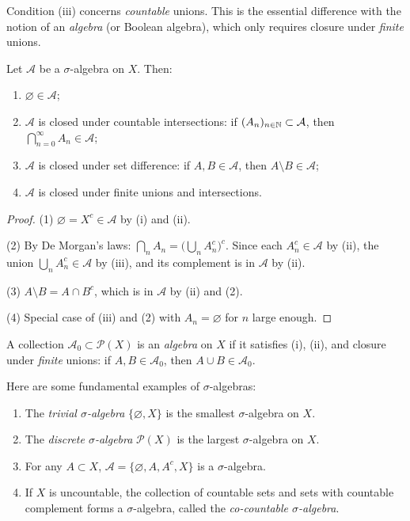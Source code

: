 \begin{remark}
Condition (iii) concerns \emph{countable} unions. This is the essential difference
with the notion of an \emph{algebra} (or Boolean algebra), which only requires
closure under \emph{finite} unions.
\end{remark}

\begin{proposition}
\label{prop:sigma_props}
Let $\mathcal{A}$ be a $\sigma$-algebra on $X$. Then:
\begin{enumerate}
    \item $\varnothing \in \mathcal{A}$;
    \item $\mathcal{A}$ is closed under countable intersections: if
    $(A_n)_{n \in \mathbb{N}} \subset \mathcal{A}$, then
    $\bigcap_{n=0}^{\infty} A_n \in \mathcal{A}$;
    \item $\mathcal{A}$ is closed under set difference: if $A, B \in \mathcal{A}$,
    then $A \setminus B \in \mathcal{A}$;
    \item $\mathcal{A}$ is closed under finite unions and intersections.
\end{enumerate}
\end{proposition}

\begin{proof}
(1) $\varnothing = X^c \in \mathcal{A}$ by (i) and (ii).

(2) By De Morgan's laws:
$\bigcap_n A_n = \bigl(\bigcup_n A_n^c\bigr)^c$. Since each
$A_n^c \in \mathcal{A}$ by (ii), the union $\bigcup_n A_n^c \in \mathcal{A}$
by (iii), and its complement is in $\mathcal{A}$ by (ii).

(3) $A \setminus B = A \cap B^c$, which is in $\mathcal{A}$ by (ii) and (2).

(4) Special case of (iii) and (2) with $A_n = \varnothing$ for $n$ large enough.
\end{proof}

\begin{definition}[Algebra]
A collection $\mathcal{A}_0 \subset \mathcal{P}(X)$ is an \emph{algebra} on $X$
if it satisfies (i), (ii), and closure under \emph{finite} unions:
if $A, B \in \mathcal{A}_0$, then $A \cup B \in \mathcal{A}_0$.
\end{definition}

\begin{example}
Here are some fundamental examples of $\sigma$-algebras:
\begin{enumerate}
    \item The \emph{trivial $\sigma$-algebra} $\{\varnothing, X\}$ is the smallest
    $\sigma$-algebra on $X$.
    \item The \emph{discrete $\sigma$-algebra} $\mathcal{P}(X)$ is the largest
    $\sigma$-algebra on $X$.
    \item For any $A \subset X$, $\mathcal{A} = \{\varnothing, A, A^c, X\}$ is a
    $\sigma$-algebra.
    \item If $X$ is uncountable, the collection of countable sets and sets with
    countable complement forms a $\sigma$-algebra, called the
    \emph{co-countable $\sigma$-algebra}.
\end{enumerate}
\end{example}

